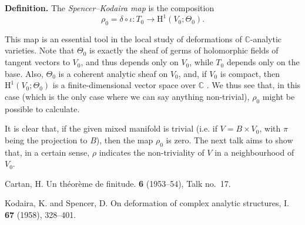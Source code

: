 \documentclass{article}
\newenvironment{rmenv}[1]
  {\phantomsection\par\medskip\noindent\textbf{#1.}\rmfamily}
  {\medskip}
\newcommand{\CC}{\mathbb{C}}
\newcommand{\HH}{\mathrm{H}}
\begin{document}
\begin{rmenv}{Definition}
  The \emph{Spencer--Kodaira map} is the composition
  \[
    \rho_0 = \delta\circ\iota\colon T_0 \to \HH^1(V_0;\Theta_0).
  \]
\end{rmenv}

This map is an essential tool in the local study of deformations of $\CC$-analytic varieties.
Note that $\Theta_0$ is exactly the sheaf of germs of holomorphic fields of tangent vectors to $V_0$, and thus depends only on $V_0$, while $T_0$ depends only on the base.
Also, $\Theta_0$ is a coherent analytic sheaf on $V_0$, and, if $V_0$ is compact, then $\HH^1(V_0;\Theta_0)$ is a finite-dimensional vector space over $\CC$ \cite{1}.
We thus see that, in this case (which is the only case where we can say anything non-trivial), $\rho_0$ might be possible to calculate.

It is clear that, if the given mixed manifold is trivial (i.e. if $V=B\times V_0$, with $\pi$ being the projection to $B$), then the map $\rho_0$ is zero.
The next talk aims to show that, in a certain sense, $\rho$ indicates the non-triviality of $V$ in a neighbourhood of $V_0$.






\nocite{*}

\begin{thebibliography}{2}

  {Cartan, H.}
  \newblock Un th\'{e}or\`{e}me de finitude.
   \textbf{6} (1953--54), Talk no.~17.

  {Kodaira, K. and Spencer, D.}
  \newblock On deformation of complex analytic structures, I.
   \textbf{67} (1958), 328--401.

\end{thebibliography}
\end{document}
